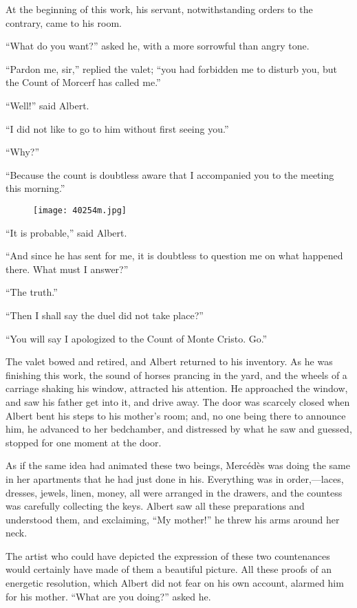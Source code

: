 At the beginning of this work, his servant, notwithstanding orders to
the contrary, came to his room.

“What do you want?” asked he, with a more sorrowful than angry tone.

“Pardon me, sir,” replied the valet; “you had forbidden me to disturb
you, but the Count of Morcerf has called me.”

“Well!” said Albert.

“I did not like to go to him without first seeing you.”

“Why?”

“Because the count is doubtless aware that I accompanied you to the
meeting this morning.”

\begin{figure}[ht]
\texttt{[image: 40254m.jpg]}
\end{figure}

“It is probable,” said Albert.

“And since he has sent for me, it is doubtless to question me on what
happened there. What must I answer?”

“The truth.”

“Then I shall say the duel did not take place?”

“You will say I apologized to the Count of Monte Cristo. Go.”

The valet bowed and retired, and Albert returned to his inventory. As
he was finishing this work, the sound of horses prancing in the yard,
and the wheels of a carriage shaking his window, attracted his
attention. He approached the window, and saw his father get into it,
and drive away. The door was scarcely closed when Albert bent his steps
to his mother’s room; and, no one being there to announce him, he
advanced to her bedchamber, and distressed by what he saw and guessed,
stopped for one moment at the door.

As if the same idea had animated these two beings, Mercédès was doing
the same in her apartments that he had just done in his. Everything was
in order,—laces, dresses, jewels, linen, money, all were arranged in
the drawers, and the countess was carefully collecting the keys. Albert
saw all these preparations and understood them, and exclaiming, “My
mother!” he threw his arms around her neck.

The artist who could have depicted the expression of these two
countenances would certainly have made of them a beautiful picture. All
these proofs of an energetic resolution, which Albert did not fear on
his own account, alarmed him for his mother. “What are you doing?”
asked he.

